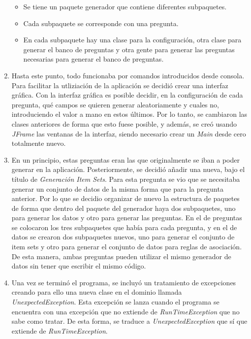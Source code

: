 \begin{enumerate}
\begin{itemize}
        \item Se tiene un paquete generador que contiene diferentes subpaquetes.
        \item Cada subpaquete se corresponde con una pregunta. 
        \item En cada subpaquete hay una clase para la configuración, otra clase para generar el banco de preguntas y otra gente para generar las preguntas necesarias para generar el banco de preguntas.
    \end{itemize}
    \item Hasta este punto, todo funcionaba por comandos introducidos desde consola. Para facilitar la utliziación de la aplicación se decidió crear una interfaz gráfica. Con la interfaz gráfica es posible decidir, en la configuración de cada pregunta, qué campos se quieren generar aleatoriamente y cuales no, introduciendo el valor a mano en estos últimos. Por lo tanto, se cambiaron las clases anteriores de forma que esto fuese posible, y además, se creó usando \textit{JFrame} las ventanas de la interfaz, siendo necesario crear un \textit{Main} desde cero totalmente nuevo.
    \item En un principio, estas preguntas eran las que originalmente se iban a poder generar en la aplicación. Posteriormente, se decidió añadir una nueva, bajo el título de \textit{Generación Item Sets}. Para esta pregunta se vio que se necesitaba generar un conjunto de datos de la misma forma que para la pregunta anterior. Por lo que se decidio organizar de nuevo la estructura de paquetes de forma que dentro del paquete del generador haya dos subpaquetes, uno para generar los datos y otro para generar las preguntas. En el de preguntas se colocaron los tres subpaquetes que había para cada pregunta, y en el de datos se crearon dos subpaquetes nuevos, uno para generar el conjunto de item sets y otro para generar el conjunto de datos para reglas de asociación. De esta manera, ambas preguntas pueden utilizar el mismo generador de datos sin tener que escribir el mismo código.
    \item Una vez se terminó el programa, se incluyó un tratamiento de excepciones creando para ello una nueva clase en el dominio llamada \textit{UnexpectedException}. Esta excepción se lanza cuando el programa se encuentra con una excepción que no extiende de \textit{RunTimeException} que no sabe como tratar. De esta forma, se traduce a \textit{UnexpectedException} que sí que extiende de \textit{RunTimeException}.
    
\end{enumerate}

